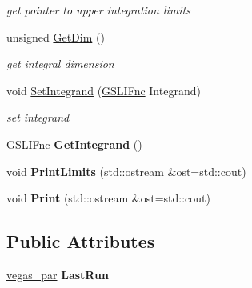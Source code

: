 \begin{DoxyCompactItemize}
\begin{DoxyCompactList}\small\item\em get pointer to upper integration limits \end{DoxyCompactList}\item 
\hypertarget{classIntegral_a6ed296293c2b08c0236481e865f853b7}{unsigned \hyperlink{classIntegral_a6ed296293c2b08c0236481e865f853b7}{Get\-Dim} ()}\label{classIntegral_a6ed296293c2b08c0236481e865f853b7}

\begin{DoxyCompactList}\small\item\em get integral dimension \end{DoxyCompactList}\item 
\hypertarget{classIntegral_ad1732ff730fedb0318db082f664aa195}{void \hyperlink{classIntegral_ad1732ff730fedb0318db082f664aa195}{Set\-Integrand} (\hyperlink{Integrator_8h_a5a37a44de4bd56d47abffb5be0efb308}{G\-S\-L\-I\-Fnc} Integrand)}\label{classIntegral_ad1732ff730fedb0318db082f664aa195}

\begin{DoxyCompactList}\small\item\em set integrand \end{DoxyCompactList}\item 
\hypertarget{classIntegral_a434ffd1525d0110a9e0d472721f51a32}{\hyperlink{Integrator_8h_a5a37a44de4bd56d47abffb5be0efb308}{G\-S\-L\-I\-Fnc} {\bfseries Get\-Integrand} ()}\label{classIntegral_a434ffd1525d0110a9e0d472721f51a32}

\item 
\hypertarget{classIntegral_a318a1ac7c8715d403046764afc47e66c}{void {\bfseries Print\-Limits} (std\-::ostream \&ost=std\-::cout)}\label{classIntegral_a318a1ac7c8715d403046764afc47e66c}

\item 
\hypertarget{classIntegral_ac16a7e08428f7b1879638a9a2981aea6}{void {\bfseries Print} (std\-::ostream \&ost=std\-::cout)}\label{classIntegral_ac16a7e08428f7b1879638a9a2981aea6}

\end{DoxyCompactItemize}
\subsection*{Public Attributes}
\begin{DoxyCompactItemize}
\item 
\hypertarget{classIntegral_a9d7c0d25642cec0937e5fae17b58b5bc}{\hyperlink{classvegas__par}{vegas\-\_\-par} {\bfseries Last\-Run}}\label{classIntegral_a9d7c0d25642cec0937e5fae17b58b5bc}

\end{DoxyCompactItemize}


